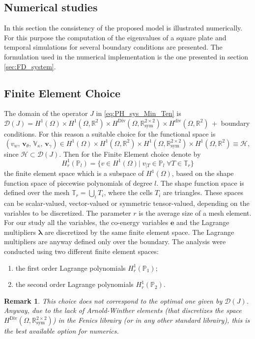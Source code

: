 \documentclass[preprint,12pt]{elsarticle}
\newcommand{\RevTwo}[1]{\textcolor{red!80!black}{#1}}
\newtheorem{remark}{Remark}
\begin{document}
\RevTwo{
\section{Numerical studies}
\label{sec:Num}
In this section the consistency of the proposed model is illustrated numerically. For this purpose the computation of the eigenvalues of a square plate and temporal simulations for several boundary conditions are presented. The formulation used in the numerical implementation is the one presented in section \ref{sec:FD_system}. 
\subsection{Finite Element Choice}
The domain of the operator $J$ in \eqref{eq:PH_sys_Min_Ten} is $\mathcal{D}(J) = H^{1}(\Omega) \times H^{1}(\Omega, \mathbb{R}^2) \times H^{\text{Div}}(\Omega, \mathbb{R}^{2 \times 2}_{\text{sym}}) \times H^{\text{div}}(\Omega, \mathbb{R}^2) \,+ $ boundary conditions. For this reason a suitable choice for the functional space is
\begin{equation*}
	(v_w, \, \bm{v}_\theta, \, \mathbb{V}_\kappa, \, \bm{v}_{\gamma}) \in H^{1}(\Omega) \times H^{1}(\Omega, \mathbb{R}^2) \times H^{1}(\Omega, \mathbb{R}^{2 \times 2}_{\text{sym}}) \times H^{1}(\Omega, \mathbb{R}^2) \equiv \mathscr{H},
\end{equation*}
since $\mathscr{H} \subset \mathcal{D}(J)$. Then for the Finite Element choice denote by
\[ H_r^1(\mathbb{P}_l) = \{ v \in H^1(\Omega)|\; v_{|T} \in \mathbb{P}_l \; \forall T \in \mathbb{T}_r \} 
\]
the finite element space which is a subspace of $H^1(\Omega)$, based on the shape function space of piecewise polynomials of degree $l$. The shape function space is defined over the mesh $\mathbb{T}_r = \bigcup_i T_i$, where the cells $T_i$ are triangles. These spaces can be scalar-valued, vector-valued or symmetric tensor-valued, depending on the variables to be discretized. The parameter $r$ is the average size of a mesh element. For our study all the variables, the co-energy variables $\bm{e}$ and the Lagrange multipliers $\bm\lambda$ are discretized by the same finite element space. The Lagrange multipliers are anyway defined only over the boundary. The analysis were conducted using two different finite element spaces:
\begin{enumerate}
	\item the first order Lagrange polynomials $H_r^1(\mathbb{P}_1)$;
	\item the second order Lagrange polynomials $H_r^1(\mathbb{P}_2)$.
\end{enumerate}
\begin{remark}
This choice does not correspond to the optimal one given by $\mathcal{D}(J)$. Anyway, due to the lack of Arnold-Winther elements \cite{Arnold2002} (that discretizes the space $H^{\text{Div}}(\Omega, \mathbb{R}^{2 \times 2}_{\text{sym}})$) in the Fenics librairy (or in any other standard librairy), this is the best available option for numerics.
\end{remark}
}
\end{document}
